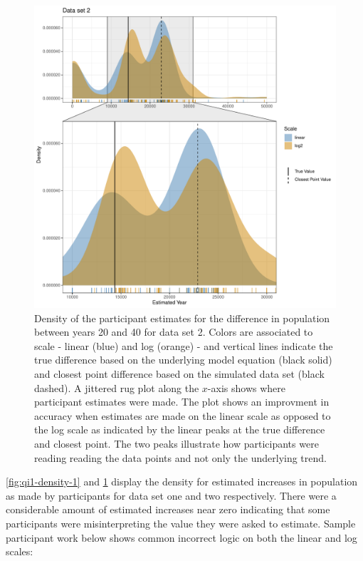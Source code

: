 \documentclass[print]{nuthesis}
\begin{document}
\begin{figure}[tbp]

{\centering \includegraphics[width=1\linewidth,]{thesis_files/figure-latex/qi1-density-2-1} 

}

\caption[Intermediate Q1 density (data set 2)]{Density of the participant estimates for the difference in population between years 20 and 40 for data set 2. Colors are associated to scale - linear (blue) and log (orange) - and vertical lines indicate the true difference based on the underlying model equation (black solid) and closest point difference based on the simulated data set (black dashed). A jittered rug plot along the $x$-axis shows where participant estimates were made. The plot shows an improvment in accuracy when estimates are made on the linear scale as opposed to the log scale as indicated by the linear peaks at the true difference and closest point. The two peaks illustrate how participants were reading reading the data points and not only the underlying trend.}\label{fig:qi1-density-2}
\end{figure}

\cref{fig:qi1-density-1} and \cref{fig:qi1-density-2} display the density for estimated increases in population as made by participants for data set one and two respectively.
There were a considerable amount of estimated increases near zero indicating that some participants were misinterpreting the value they were asked to estimate.
Sample participant work below shows common incorrect logic on both the linear and log scales:
\end{document}

